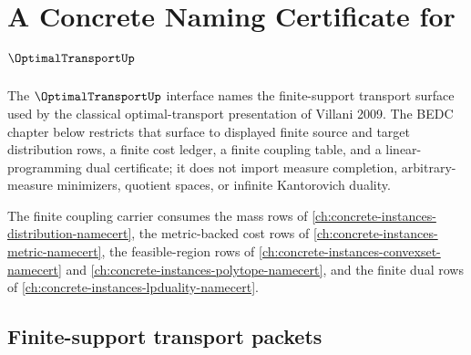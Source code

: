 \chapter{A Concrete Naming Certificate for $\OptimalTransportUp$}
\label{ch:concrete-instances-optimaltransport-namecert}

The $\OptimalTransportUp$ interface names the finite-support transport surface used by the classical optimal-transport presentation of Villani 2009. The BEDC chapter below restricts that surface to displayed finite source and target distribution rows, a finite cost ledger, a finite coupling table, and a linear-programming dual certificate; it does not import measure completion, arbitrary-measure minimizers, quotient spaces, or infinite Kantorovich duality.

The finite coupling carrier consumes the mass rows of \autoref{ch:concrete-instances-distribution-namecert}, the metric-backed cost rows of \autoref{ch:concrete-instances-metric-namecert}, the feasible-region rows of \autoref{ch:concrete-instances-convexset-namecert} and \autoref{ch:concrete-instances-polytope-namecert}, and the finite dual rows of \autoref{ch:concrete-instances-lpduality-namecert}.

\section{Finite-support transport packets}
\label{sec:optimaltransport-finite-support-packets}

